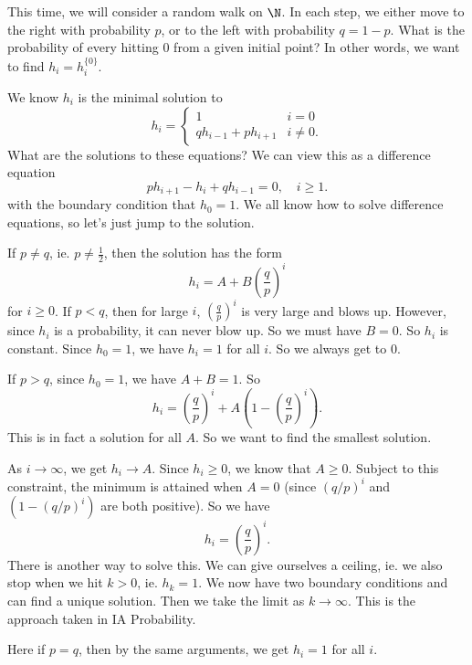 \documentclass[a4paper]{article}
\begin{document}
\begin{eg}
  This time, we will consider a random walk on $\N$. In each step, we either move to the right with probability $p$, or to the left with probability $q = 1 - p$. What is the probability of every hitting $0$ from a given initial point? In other words, we want to find $h_i = h_i^{\{0\}}$.

  We know $h_i$ is the minimal solution to
  \[
    h_i =
    \begin{cases}
      1 & i = 0\\
      qh_{i - 1} + ph_{i + 1} & i \not= 0.
    \end{cases}
  \]
  What are the solutions to these equations? We can view this as a difference equation
  \[
    ph_{i + 1} - h_i + qh_{i - 1} = 0,\quad i \geq 1.
  \]
  with the boundary condition that $h_0 = 1$. We all know how to solve difference equations, so let's just jump to the solution.

  If $p \not= q$, ie. $p \not= \frac{1}{2}$, then the solution has the form
  \[
    h_i = A + B\left(\frac{q}{p}\right)^i
  \]
  for $i \geq 0$. If $p < q$, then for large $i$, $\left(\frac{q}{p}\right)^i$ is very large and blows up. However, since $h_i$ is a probability, it can never blow up. So we must have $B = 0$. So $h_i$ is constant. Since $h_0 = 1$, we have $h_i = 1$ for all $i$. So we always get to $0$.

  If $p > q$, since $h_0 = 1$, we have $A + B = 1$. So
  \[
    h_i = \left(\frac{q}{p}\right)^i + A\left(1 - \left(\frac{q}{p}\right)^i\right).
  \]
  This is in fact a solution for all $A$. So we want to find the smallest solution.

  As $i \to\infty$, we get $h_i \to A$. Since $h_i \geq 0$, we know that $A \geq 0$. Subject to this constraint, the minimum is attained when $A = 0$ (since $(q/p)^i$ and $(1 - (q/p)^i)$ are both positive). So we have
  \[
    h_i = \left(\frac{q}{p}\right)^i.
  \]
  There is another way to solve this. We can give ourselves a ceiling, ie. we also stop when we hit $k > 0$, ie. $h_k = 1$. We now have two boundary conditions and can find a unique solution. Then we take the limit as $k \to \infty$. This is the approach taken in IA Probability.

  Here if $p = q$, then by the same arguments, we get $h_i = 1$ for all $i$.
\end{eg}
\end{document}
